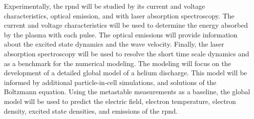 Experimentally, the \acs{rpnd} will be studied by its current and voltage
characteristics, optical emission, and with laser absorption spectroscopy. The
current and voltage characteristics will be used to determine the energy
absorbed by the plasma with each pulse. The optical emissions will provide
information about the excited state dynamics and the wave velocity. Finally, the
laser absorption spectroscopy will be used to resolve the short time scale
dynamics and as a benchmark for the numerical modeling. The modeling will focus
on the development of a detailed global model of a helium discharge. This model
will be informed by additional particle-in-cell simulations, and solutions of
the Boltzmann equation. Using the metastable measurements as a baseline, the
global model will be used to predict the electric field, electron temperature,
electron density, excited state densities, and emissions of the \acs{rpnd}.

